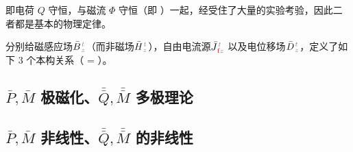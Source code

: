  即电荷 $Q$ 守恒，与磁流 $\Phi$ 守恒（即 ）一起\cite{hehlSpacetimeMetricLocal2006}，经受住了大量的实验考验\cite{hehlGentleIntroductionFoundations2000}，因此二者都是基本的物理定律\cite{hehlRecentDevelopmentsPremetric2006}。

分别给磁感应场$\bar{B}^{\;\!\textcolor{gray}{t}}_{\;\!\textcolor{gray}{z}}$（而非磁场$\bar{H}^{\;\!\textcolor{gray}{t}}_{\;\!\textcolor{gray}{z}}$），自由电流源$\bar{J}^{\;\!\textcolor{gray}{t}}_{\;\!\textcolor{Maroon}{\text{f}}\textcolor{gray}{z}}$ 以及电位移场$\bar{D}^{\;\!\textcolor{gray}{t}}_{\;\!\textcolor{gray}{z}}$，定义了如下 3 个本构关系（\textcolor{Maroon}{} = \textcolor{Maroon}{}）。

\subsection{$\bar{P},\bar{M}$ 极磁化、$\bar{\bar{Q}},\bar{\bar{M}}$ 多极理论}\label{ssec:pm}

\subsection{$\bar{P},\bar{M}$ 非线性、$\bar{\bar{Q}},\bar{\bar{M}}$ 的非线性}\label{ssec:pm-non}

